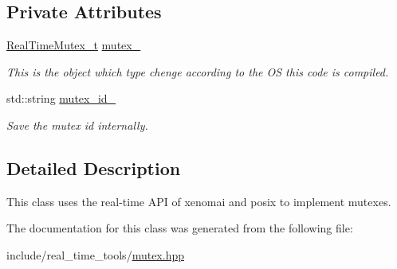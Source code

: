 \subsection*{Private Attributes}
\begin{DoxyCompactItemize}
\item 
\hyperlink{mutex_8hpp_a1ddc3c11c7ede92bbf52bafb61009ba2}{Real\+Time\+Mutex\+\_\+t} \hyperlink{classreal__time__tools_1_1RealTimeMutex_a21e60b2fffe69eba625590fa3201404b}{mutex\+\_\+}\hypertarget{classreal__time__tools_1_1RealTimeMutex_a21e60b2fffe69eba625590fa3201404b}{}\label{classreal__time__tools_1_1RealTimeMutex_a21e60b2fffe69eba625590fa3201404b}

\begin{DoxyCompactList}\small\item\em This is the object which type chenge according to the OS this code is compiled. \end{DoxyCompactList}\item 
std\+::string \hyperlink{classreal__time__tools_1_1RealTimeMutex_a42edb13b07a983e48d9348bb20465962}{mutex\+\_\+id\+\_\+}\hypertarget{classreal__time__tools_1_1RealTimeMutex_a42edb13b07a983e48d9348bb20465962}{}\label{classreal__time__tools_1_1RealTimeMutex_a42edb13b07a983e48d9348bb20465962}

\begin{DoxyCompactList}\small\item\em Save the mutex id internally. \end{DoxyCompactList}\end{DoxyCompactItemize}


\subsection{Detailed Description}
This class uses the real-\/time A\+PI of xenomai and posix to implement mutexes. 

The documentation for this class was generated from the following file\+:\begin{DoxyCompactItemize}
\item 
include/real\+\_\+time\+\_\+tools/\hyperlink{mutex_8hpp}{mutex.\+hpp}\end{DoxyCompactItemize}

